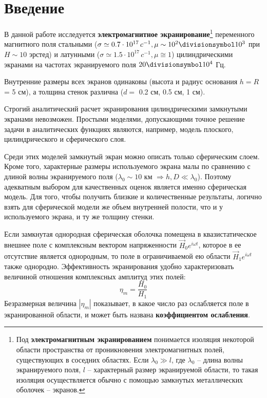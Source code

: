 


\def\labauthors{Карусевич А.А., Шиков А.П.}
\def\labgroup{440}
\def\labnumber{2}
\def\labtheme{Электромагнитное экранирование}


\newpage

\section*{Введение}
\label{sec:input}

В данной работе исследуется \textbf{электромагнитное экранирование}\footnote{Под \textbf{электромагнитным экранированием} понимается изоляция некоторой области пространства от проникновения электромагнитных полей, существующих в соседних областях. Если $\lambda_0\gg l$, где $\lambda_0$ -- длина волны экранируемого поля, $l$ -- характерный размер экранируемой области, то такая изоляция осуществляется обычно с помощью замкнутых металлических оболочек -- экранов.} переменного магнитного поля стальными ($\sigma \simeq 0.7\cdot 10^{17} \,c^{-1}, \mu \sim 10^2 \divisionsymbol 10^3 $ при $H \sim 10$ эрстед) и латунными ($\sigma \simeq 1.5\cdot 10^{17}\, c^{-1}, \mu \cong 1$) цилиндрическими экранами на частотах экранируемого поля $20\divisionsymbol10^4$ Гц.  

Внутренние размеры всех экранов одинаковы (высота и радиус основания $h=R$ = 5 см), а толщина стенок различна ($d=$ 0.2 см, 0.5 см, 1 см). 

Строгий аналитический расчет экранирования цилиндрическими замкнутыми экранами невозможен. Простыми моделями, допускающими точное решение задачи в аналитических функциях являются, например, модель плоского, цилиндрического и сферического слоя.

Среди этих моделей замкнутый экран можно описать только сферическим слоем. Кроме того, характерные размеры используемого экрана малы по сравнению с длиной волны экранируемого поля ($\lambda_0\sim10$ км $\Rightarrow h,D\ll\lambda_0$). Поэтому адекватным выбором для качественных оценок является именно сферическая модель. Для того, чтобы получить близкие и количественные результаты, логично взять для сферической модели же объем внутренней полости, что и у используемого экрана, и ту же толщину стенки.


Если замкнутая однородная сферическая оболочка помещена в квазистатическое внешнее поле с комплексным вектором напряженности $\vec{H}_{0} e^{i \omega t}$, которое в ее отсутствие является однородным, то поле в ограничиваемой ею области $\vec{H}_{1} e^{i \omega t}$ также однородно. Эффективность экранирования удобно характеризовать величиной отношения комплексных амплитуд этих полей:
\begin{equation} 
	\eta_{m}=\frac{H_0}{H_1}
	\label{eq:1}
\end{equation}
Безразмерная величина $|\eta_{m}|$ показывает, в какое число раз ослабляется поле в экранированной области, и может быть названа \textbf{коэффициентом ослабления}. 

